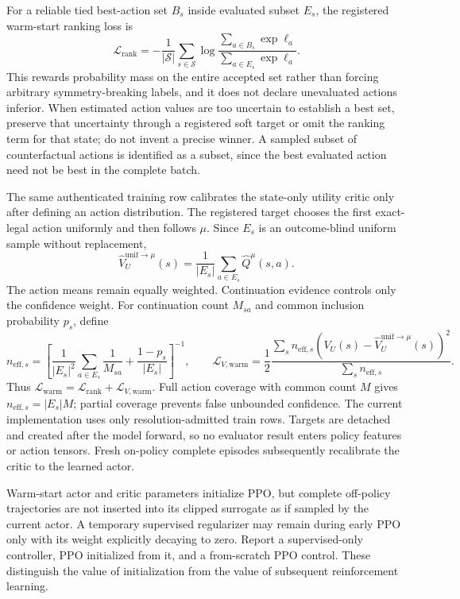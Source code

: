 \documentclass[11pt,a4paper]{article}
\theoremstyle{definition}\newtheorem{definition}[proposition]{Definition}
\begin{document}
For a reliable tied best-action set \(B_s\) inside evaluated subset \(E_s\), the registered
warm-start ranking loss is
\[
 \mathcal L_{\mathrm{rank}}
 =-\frac{1}{|\mathcal S|}\sum_{s\in\mathcal S}
 \log\frac{\sum_{a\in B_s}\exp\ell_a}
 {\sum_{a\in E_s}\exp\ell_a}.
\]
This rewards probability mass on the entire accepted set rather than forcing arbitrary
symmetry-breaking labels, and it does not declare unevaluated actions inferior. When estimated
action values are too uncertain to establish a best set, preserve that uncertainty through a
registered soft target or omit the ranking term for that state; do not invent a precise winner. A
sampled subset of counterfactual actions is identified as a subset, since the best evaluated
action need not be best in the complete batch.

The same authenticated training row calibrates the state-only utility critic only after defining
an action distribution. The registered target chooses the first exact-legal action uniformly and
then follows \(\mu\). Since \(E_s\) is an outcome-blind uniform sample without replacement,
\[
 \widehat V_U^{\mathrm{unif}\rightarrow\mu}(s)
 =\frac{1}{|E_s|}\sum_{a\in E_s}\widehat Q^\mu(s,a).
\]
The action means remain equally weighted. Continuation evidence controls only the confidence
weight. For continuation count \(M_{sa}\) and common inclusion probability \(p_s\), define
\[
 n_{\mathrm{eff},s}=\left[
 \frac{1}{|E_s|^2}\sum_{a\in E_s}\frac{1}{M_{sa}}
 +\frac{1-p_s}{|E_s|}\right]^{-1},
 \qquad
 \mathcal L_{V,\mathrm{warm}}=
 \frac{1}{2}\frac{\sum_s n_{\mathrm{eff},s}
 (V_U(s)-\widehat V_U^{\mathrm{unif}\rightarrow\mu}(s))^2}
 {\sum_s n_{\mathrm{eff},s}}.
\]
Thus \(\mathcal L_{\mathrm{warm}}=\mathcal L_{\mathrm{rank}}+
\mathcal L_{V,\mathrm{warm}}\). Full action coverage with common count \(M\) gives
\(n_{\mathrm{eff},s}=|E_s|M\); partial coverage prevents false unbounded confidence. The current
implementation uses only resolution-admitted train rows. Targets are detached and created after
the model forward, so no evaluator result enters policy features or action tensors. Fresh
on-policy complete episodes subsequently recalibrate the critic to the learned actor.

Warm-start actor and critic parameters initialize PPO, but complete off-policy trajectories are
not inserted into its clipped surrogate as if sampled by the current actor. A temporary supervised
regularizer may remain during early PPO only with its weight explicitly decaying to zero. Report a
supervised-only controller, PPO initialized from it, and a from-scratch PPO control. These distinguish
the value of initialization from the value of subsequent reinforcement learning.
\end{document}
